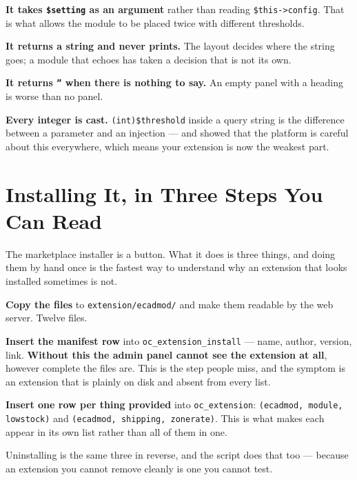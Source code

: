\begin{conceptbox}
\begin{tightnum}
  \item \textbf{It takes \texttt{\$setting} as an argument} rather than reading
        \texttt{\$this->config}. That is what allows the module to be placed
        twice with different thresholds.
  \item \textbf{It returns a string and never prints.} The layout decides where
        the string goes; a module that echoes has taken a decision that is not
        its own.
  \item \textbf{It returns \texttt{''} when there is nothing to say.} An empty
        panel with a heading is worse than no panel.
  \item \textbf{Every integer is cast.} \texttt{(int)\$threshold} inside a
        query string is the difference between a parameter and an injection
        --- and  showed that the platform is careful about this
        everywhere, which means your extension is now the weakest part.
\end{tightnum}
\end{conceptbox}

\section{Installing It, in Three Steps You Can Read}

The marketplace installer is a button. What it does is three things, and doing
them by hand once is the fastest way to understand why an extension that looks
installed sometimes is not.

\begin{examplebox}
\begin{tightnum}
  \item \textbf{Copy the files} to \texttt{extension/ecadmod/} and make them
        readable by the web server. Twelve files.
  \item \textbf{Insert the manifest row} into \texttt{oc\_extension\_install}
        --- name, author, version, link. \textbf{Without this the admin panel
        cannot see the extension at all}, however complete the files are. This
        is the step people miss, and the symptom is an extension that is
        plainly on disk and absent from every list.
  \item \textbf{Insert one row per thing provided} into
        \texttt{oc\_extension}: \texttt{(ecadmod, module, lowstock)} and
        \texttt{(ecadmod, shipping, zonerate)}. This is what makes each appear
        in its own list rather than all of them in one.
\end{tightnum}

\smallskip
Uninstalling is the same three in reverse, and the script does that too ---
because an extension you cannot remove cleanly is one you cannot test.
\end{examplebox}

